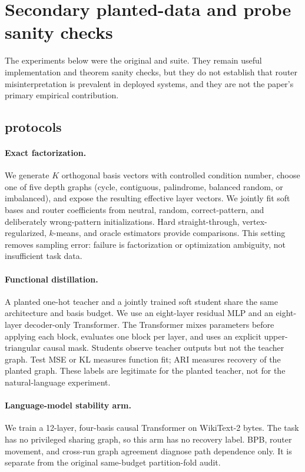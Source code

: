 

\section{Secondary planted-data and probe sanity checks}
\label{app:secondary-sanity}

The experiments below were the original \TyingBench{} and \method{} suite.
They remain useful implementation and theorem sanity checks, but they do not
establish that router misinterpretation is prevalent in deployed systems, and
they are not the paper's primary empirical contribution.

\subsection{\TyingBench{} protocols}

\paragraph{Exact factorization.}
We generate $K$ orthogonal basis vectors with controlled condition number,
choose one of five depth graphs (cycle, contiguous, palindrome, balanced
random, or imbalanced), and expose the resulting effective layer vectors.  We
jointly fit soft bases and router coefficients from neutral, random,
correct-pattern, and deliberately wrong-pattern initializations.  Hard
straight-through, vertex-regularized, $k$-means, and oracle estimators provide
comparisons.  This setting removes sampling error: failure is factorization or
optimization ambiguity, not insufficient task data.

\paragraph{Functional distillation.}
A planted one-hot teacher and a jointly trained soft student share the same
architecture and basis budget.  We use an eight-layer residual MLP and an
eight-layer decoder-only Transformer.  The Transformer mixes parameters before
applying each block, evaluates one block per layer, and uses an explicit
upper-triangular causal mask.  Students observe teacher outputs but not the
teacher graph.  Test MSE or KL measures function fit; ARI measures recovery of
the planted graph.  These labels are legitimate for the planted teacher, not
for the natural-language experiment.

\paragraph{Language-model stability arm.}
We train a 12-layer, four-basis causal Transformer on WikiText-2 bytes.  The
task has no privileged sharing graph, so this arm has no recovery label.  BPB,
router movement, and cross-run graph agreement diagnose path dependence only.
It is separate from the original same-budget partition-fold audit.

